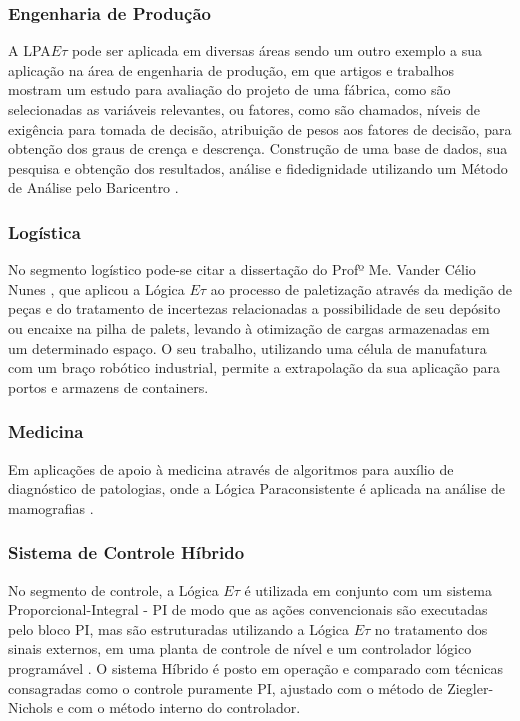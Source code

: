 \subsubsection{Engenharia de Produção}

A LPA$E\tau$ pode ser aplicada em diversas áreas sendo um outro
exemplo a sua aplicação na área de engenharia de produção,
em que artigos e trabalhos mostram um estudo para avaliação do projeto
de uma fábrica, como são selecionadas as variáveis relevantes, ou
fatores, como são chamados, níveis de exigência para tomada de decisão, 
atribuição de pesos aos fatores de decisão, para obtenção dos graus de crença e descrença. 
Construção de uma base de dados, sua pesquisa e obtenção dos
resultados, análise e fidedignidade utilizando um Método de Análise
pelo Baricentro
\cite{FabioIsraelJair}.


\subsubsection{Logística}

No segmento logístico pode-se citar a dissertação do Profº Me. Vander Célio Nunes \cite{Vander}, que aplicou a Lógica $E\tau$ ao processo de paletização através da medição de peças e do tratamento de incertezas relacionadas a possibilidade de seu depósito ou encaixe na pilha de palets, levando à otimização de cargas armazenadas em um determinado espaço. 
O seu trabalho, utilizando uma célula de manufatura com um braço robótico industrial, permite a extrapolação da sua aplicação para portos e armazens de containers.



\subsubsection{Medicina}

Em aplicações de apoio à medicina através de algoritmos para
auxílio de diagnóstico de patologias,
onde a Lógica Paraconsistente é aplicada na análise de mamografias
\cite{MauricioCM}.



\subsubsection{Sistema de Controle Híbrido}

No segmento de controle, a Lógica $E\tau$ é utilizada em conjunto com um sistema Proporcional-Integral - PI de modo que as ações convencionais são executadas pelo bloco PI, mas são estruturadas utilizando a Lógica $E\tau$ no tratamento dos sinais externos, 
em uma planta de controle de nível e um controlador lógico programável
 \cite{Marcelo}. 
O sistema Híbrido é posto em operação e comparado com técnicas consagradas como o controle puramente PI, ajustado com o método de Ziegler-Nichols e com o método interno do controlador. 




